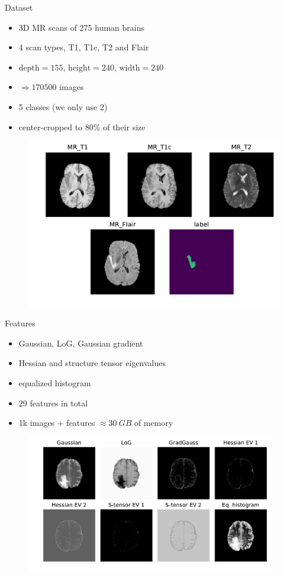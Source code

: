 \documentclass[final]{beamer}
\newlength{\onecolwid}
\begin{document}
\begin{frame}[t]
\begin{columns}[t]
\begin{column}{\onecolwid}
\begin{alertblock}{Dataset}
\begin{itemize}[label={}]
\item 3D MR scans of 275 human brains
\item 4 scan types, T1, T1c, T2 and Flair
\item $\mathrm{depth}=155$, $\mathrm{height}=240$, $\mathrm{width}=240$
\item $\Rightarrow 170500$ images
\item 5 classes (we only use 2)
\item center-cropped to $80\%$ of their size
\end{itemize}
\begin{figure}
\includegraphics[width=0.9\linewidth]{scan_types_trans}
\end{figure}

\end{alertblock}

\begin{block}{Features}
\begin{itemize}[label={}]
\item Gaussian, LoG, Gaussian gradient
\item Hessian and structure tensor eigenvalues
\item equalized histogram
\item 29 features in total
\item 1k images + features $\approx \SI{30}{GB}$ of memory
\end{itemize}
\begin{figure}
\includegraphics[width=0.97\textwidth]{features}
\end{figure}
\end{block}



\end{column}
\end{columns}
\end{frame}
\end{document}
